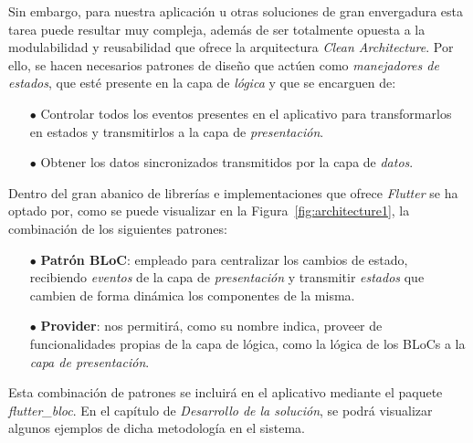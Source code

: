 Sin embargo, para nuestra aplicación u otras soluciones de gran envergadura esta tarea puede resultar muy compleja,
además de ser totalmente opuesta a la modulabilidad y reusabilidad que ofrece la arquitectura \textit{Clean Architecture}.
Por ello, se hacen necesarios patrones de diseño que actúen como
\textit{manejadores de estados}, que esté presente en la capa de \textit{lógica} y que se encarguen de:

\begin{itemize}
  \item[$\bullet$] Controlar todos los eventos presentes en el aplicativo 
  para transformarlos en estados y transmitirlos a la capa de \textit{presentación}.
  \item[$\bullet$] Obtener los datos sincronizados transmitidos por la capa de \textit{datos}.
\end{itemize}

Dentro del gran abanico de librerías e implementaciones que ofrece \textit{Flutter} se ha optado por, como se puede 
visualizar en la Figura~\ref{fig:architecture1}, la combinación de los siguientes patrones:

\begin{itemize}
  \item[$\bullet$] \textbf{Patrón BLoC}: empleado para centralizar los cambios de estado, recibiendo \textit{eventos}
   de la capa de \textit{presentación} y transmitir \textit{estados} que cambien de forma dinámica los componentes de
    la misma.
  \item[$\bullet$] \textbf{Provider}: nos permitirá, como su nombre indica, proveer de funcionalidades propias
  de la capa de lógica, como la lógica de los BLoCs a la \textit{capa de presentación}.
\end{itemize}

Esta combinación de patrones se incluirá en el aplicativo mediante el paquete \textit{flutter\_bloc}.
En el capítulo de \textit{Desarrollo de la solución}, se podrá visualizar algunos ejemplos de dicha metodología en
el sistema.
